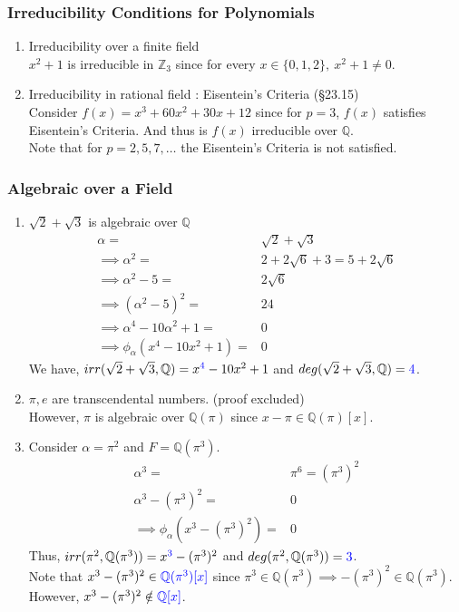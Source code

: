 \subsubsection{Irreducibility Conditions for Polynomials}
\begin{enumerate}
	\item Irreducibility over a finite field\\
		$x^2+1$ is irreducible in $\mathbb{Z}_3$ since for every $x \in \{ 0,1,2 \},\ x^2+1 \ne 0$.
\item Irreducibility in rational field : Eisentein's Criteria (\S23.15) \\
	Consider $f(x) = x^3+60x^2+30x+12$ since for $p=3$, $f(x)$ satisfies Eisentein's Criteria.
		And thus is $f(x)$ irreducible over $\mathbb{Q}$.\\
	Note that for $p = 2,5,7,\dots$ the Eisentein's Criteria is not satisfied.
\end{enumerate}
\subsubsection{Algebraic over a Field}
\begin{enumerate}
	\item $\sqrt{2}+\sqrt{3}$ is algebraic over $\mathbb{Q}$ \cite[Exercise 29.2]{fraleigh}
	\begin{align*}
		\alpha = & \sqrt{2} + \sqrt{3} \\
		\implies \alpha^2 = & 2 + 2\sqrt{6} + 3 =  5 + 2\sqrt{6}  \\
		\implies \alpha^2 - 5 =  & 2\sqrt{6} \\
		\implies  (\alpha^2-5)^2 = & 24 \\
		\implies \alpha^4 - 10\alpha^2 + 1 = & 0 \\
		\implies \phi_{\alpha}(x^4 - 10x^2 + 1) = & 0 
	\end{align*}
		We have, $irr(\sqrt{2}+\sqrt{3},\mathbb{Q}) = x^{\textcolor{blue}{4}}-10x^2+1$ and $deg(\sqrt{2}+\sqrt{3},\mathbb{Q}) = \textcolor{blue}{4}$.
	\item $\pi,e$ are transcendental numbers. (proof excluded)\\
		However, $\pi$ is algebraic over $\mathbb{Q}(\pi)$ since $x-\pi \in \mathbb{Q}(\pi)[x]$.
		
	\item Consider $\alpha = \pi^2$ and $F = \mathbb{Q}(\pi^3)$. \cite[Exercise 29.16]{fraleigh}
	\begin{align*}
		\alpha^3 = & \pi^6 = (\pi^3)^2 \\
		\alpha^3-(\pi^3)^2 = & 0 \\
		\implies \phi_\alpha(x^3-(\pi^3)^2) = & 0 
	\end{align*}
	Thus, $irr(\pi^2,\mathbb{Q}(\pi^3)) = x^{\textcolor{blue}{3}}-(\pi^3)^2$ and $deg(\pi^2,\mathbb{Q}(\pi^3)) = \textcolor{blue}{3}$.\\ 
		Note that $x^3-(\pi^3)^2 \in \textcolor{blue}{\mathbb{Q}(\pi^3)[x]}$ since $\pi^3 \in \mathbb{Q}(\pi^3) \implies -(\pi^3)^2 \in \mathbb{Q}(\pi^3)$.
		However, $x^3-(\pi^3)^2 \notin \textcolor{blue}{\mathbb{Q}[x]}$.
\end{enumerate}
